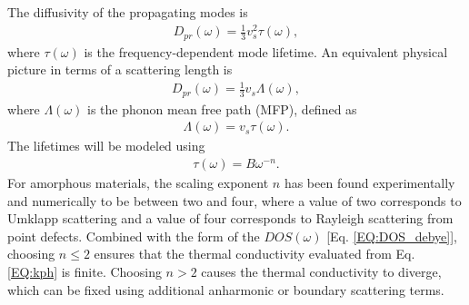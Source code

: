\documentclass[aps,prb,onecolumn,preprint,superscriptaddress,footinbib,amsmath,amssymb,floatfix]{revtex4}
\begin{document}
The diffusivity of the propagating modes is    
\begin{equation}\label{EQ:Dtau}
\begin{split}
D_{pr}(\omega) = \frac{1}{3}v^2_s\tau(\omega),
\end{split}
\end{equation}
where $\tau(\omega)$ is the frequency-dependent mode 
lifetime.\cite{ziman_electrons_2001} An equivalent physical 
picture in terms of a scattering length is
\begin{equation}\label{EQ:DLambda}
\begin{split}
D_{pr}(\omega) = \frac{1}{3}v_s \Lambda(\omega),
\end{split}
\end{equation}
where $\Lambda(\omega)$ is the phonon mean free path (MFP), defined as 
\begin{equation}\label{EQ:Lambda}
\begin{split}
\Lambda(\omega) = v_{s} \tau(\omega).
\end{split}
\end{equation}
The lifetimes will be modeled using 
\begin{equation}\label{EQ:tauw2}
\begin{split}
\tau(\omega) = B \omega^{-n}.
\end{split}
\end{equation}
For amorphous materials, the scaling exponent $n$ 
has been found experimentally and numerically to be 
between two and four,
\cite{vacher_ultrasonic_1981,
feldman_thermal_1993,morath_phonon_1996,benassi_evidence_1996,
feldman_numerical_1999,taraskin_determination_1999,
taraskin_propagation_2000,gotze_evolution_2000,ruocco_relaxation_2000,
ruocco_high-frequency_2001,horbach_high_2001,
matic_sound_2001,
feldman_calculations_2002,ruffle_observation_2003,
masciovecchio_evidence_2006,schirmacher_acoustic_2007,
christie_vibrational_2007,
shintani_universal_2008,xu_energy_2009,
liu_high_2009,ganter_rayleigh_2010,
vitelli_heat_2010,
baldi_sound_2010,yang_anomalously_2010,
wyart_scaling_2010,baldi_elastic_2011,
he_heat_2011,ayrinhac_subterahertz_2011,
baldi_emergence_2013}
where a value of two corresponds to 
Umklapp scattering\cite{callaway_model_1959} and a value of four 
corresponds to 
Rayleigh scattering from point defects.\cite{klemens_scattering_1955}
Combined with the form of the $DOS(\omega)$ 
[Eq. \eqref{EQ:DOS_debye}], choosing $n\le2$ ensures that the 
thermal conductivity evaluated from Eq. \eqref{EQ:kph} is finite. 
Choosing $n>2$ causes the thermal conductivity to diverge,   
which can be fixed using additional anharmonic
\cite{feldman_thermal_1993,feldman_numerical_1999} 
or boundary scattering terms.
\cite{cahill_thermal_1994,liu_high_2009,yang_anomalously_2010}
\end{document}
